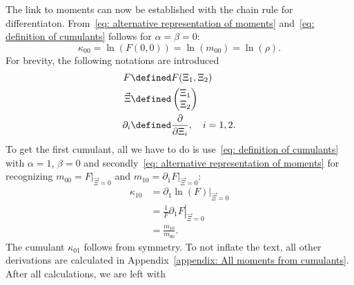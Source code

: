 
The link to moments can now be established with the chain rule for differentiaton.
From~\eqref{eq: alternative representation of moments} and~\eqref{eq: definition of cumulants} follows for $\alpha=\beta=0$:
\begin{equation*}
  \kappa_{00} = \ln(F(0,0)) = \ln(m_{00}) = \ln(\rho).
\end{equation*}
For brevity, the following notations are introduced
\begin{equation}
  \label{eq: abbreviations for deriving cumulants from moments}
  \begin{aligned}
    F & \defined F(\Xi_1, \Xi_2) \\
    \vec{\Xi} &\defined \begin{pmatrix}\Xi_1 \\ \Xi_2  \end{pmatrix} \\
    \partial_i &\defined \frac{\partial}{\partial \Xi_i},\quad i=1,2.
  \end{aligned}
\end{equation}
To get the first cumulant, all we have to do is use~\eqref{eq: definition of cumulants} with $\alpha=1$, $\beta=0$ and secondly~\eqref{eq: alternative representation of moments}
for recognizing $m_{00} = \left. F \right|_{\vec{\Xi} = 0} $ and $m_{10} = \left. \partial_1 F \right|_{\vec{\Xi} = 0}$:
\begin{equation}
  \begin{aligned}
    \kappa_{10} & = \left.\partial_1 \ln(F) \right|_{\vec{\Xi} = 0} \\
    & = \left. \frac{1}{F} \partial_1 F \right|_{\vec{\Xi} = 0} \\
    & = \frac{m_{10}}{m_{00}}.
  \end{aligned}
\end{equation}
The cumulant $\kappa_{01}$ follows from symmetry.
To not inflate the text, all other derivations are calculated in Appendix~\ref{appendix: All moments from cumulants}.
After all calculations, we are left with
